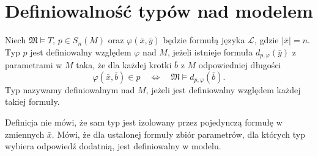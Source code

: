 \section{Definiowalność typów nad modelem}

\begin{definicja}
\label{def:mod-definable-type}
Niech $\mathfrak M\models T$,
$p\in S_n(M)$ oraz $\varphi(\bar x,\bar y)$
będzie formułą języka $\mathcal L$,
gdzie $|\bar x|=n$.
Typ $p$ jest definiowalny względem $\varphi$ nad $M$,
jeżeli istnieje formuła $d_{p,\varphi}(\bar y)$
z parametrami w $M$ taka, że dla każdej
krotki $\bar b$ z $M$ odpowiedniej długości
\[
\varphi(\bar x,\bar b)\in p
\quad\Longleftrightarrow\quad
\mathfrak M\models d_{p,\varphi}(\bar b).
\]
Typ nazywamy definiowalnym nad $M$, jeżeli
jest definiowalny względem każdej takiej formuły.
\end{definicja}

Definicja nie mówi, że sam typ jest izolowany
przez pojedynczą formułę w zmiennych $\bar x$.
Mówi, że dla ustalonej formuły zbiór parametrów,
dla których typ wybiera odpowiedź dodatnią,
jest definiowalny w modelu.

